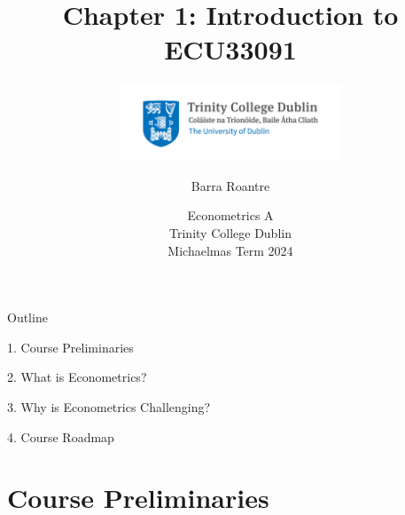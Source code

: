 \documentclass[11pt,english,handout]{beamer}
\subtitle{
    \includegraphics[width=0.50\textwidth]{TCDlogo.jpg}
}
\begin{document}
\begin{frame}[noframenumbering]{}
\vspace{0.5cm}
\title[]{Chapter 1: Introduction to ECU33091}
\author{Barra Roantre}
\date{Econometrics A \\ Trinity College Dublin \\ Michaelmas Term 2024} 
\titlepage {\small{}\ }\thispagestyle{empty} \vspace{-30pt}

\end{frame}
 
\begin{frame}{Outline}

	1. Course Preliminaries
	\vspace{0.8cm}

	2. What is Econometrics?
	\vspace{0.8cm}

	3. Why is Econometrics Challenging?
	\vspace{0.8cm}

	4. Course Roadmap

\end{frame}


\section{Course Preliminaries}
\end{document}
